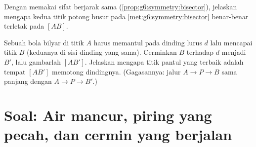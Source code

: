 \begin{exercise}[$\star\star$]\label{exo:g6:symmetry:11}
Dengan memakai sifat berjarak sama
(\cref{prop:g6:symmetry:bisector}), jelaskan mengapa kedua titik
potong busur pada \cref{met:g6:symmetry:bisector} benar-benar terletak
pada  $[AB]$.
\end{exercise}

\begin{exercise}[$\star\star\star$]\label{exo:g6:symmetry:12}
Sebuah bola bilyar di titik $A$ harus memantul pada dinding lurus $d$
lalu mencapai titik $B$ (keduanya di sisi dinding yang sama).
Cerminkan $B$ terhadap $d$ menjadi $B'$, lalu gambarlah 
$[AB']$. Jelaskan mengapa titik pantul yang terbaik adalah tempat
$[AB']$ memotong dindingnya. (Gagasannya: jalur $A \to P \to B$ sama
panjang dengan $A \to P \to B'$.)
\end{exercise}

\section{Soal: Air mancur, piring yang pecah, dan cermin yang
berjalan}

